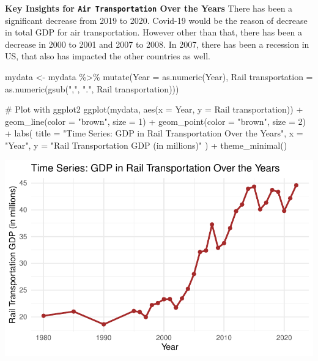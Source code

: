 \documentclass[
  letterpaper,
  DIV=11,
  numbers=noendperiod]{scrreprt}
\newenvironment{Shaded}{\begin{snugshade}}{\end{snugshade}}
\newcommand{\AttributeTok}[1]{\textcolor[rgb]{0.40,0.45,0.13}{#1}}
\newcommand{\CommentTok}[1]{\textcolor[rgb]{0.37,0.37,0.37}{#1}}
\newcommand{\DecValTok}[1]{\textcolor[rgb]{0.68,0.00,0.00}{#1}}
\newcommand{\FunctionTok}[1]{\textcolor[rgb]{0.28,0.35,0.67}{#1}}
\newcommand{\NormalTok}[1]{\textcolor[rgb]{0.00,0.23,0.31}{#1}}
\newcommand{\OtherTok}[1]{\textcolor[rgb]{0.00,0.23,0.31}{#1}}
\newcommand{\SpecialCharTok}[1]{\textcolor[rgb]{0.37,0.37,0.37}{#1}}
\newcommand{\StringTok}[1]{\textcolor[rgb]{0.13,0.47,0.30}{#1}}
\begin{document}
\textbf{Key Insights for \texttt{Air\ Transportation} Over the Years}
There has been a significant decrease from 2019 to 2020. Covid-19 would
be the reason of decrease in total GDP for air transportation. However
other than that, there has been a decrease in 2000 to 2001 and 2007 to
2008. In 2007, there has been a recession in US, that also has impacted
the other countries as well.

\begin{Shaded}
\begin{Highlighting}[]
\NormalTok{mydata }\OtherTok{\textless{}{-}}\NormalTok{ mydata }\SpecialCharTok{\%\textgreater{}\%}
  \FunctionTok{mutate}\NormalTok{(}\AttributeTok{Year =} \FunctionTok{as.numeric}\NormalTok{(Year),}
         \StringTok{\textasciigrave{}}\AttributeTok{Rail transportation}\StringTok{\textasciigrave{}} \OtherTok{=} \FunctionTok{as.numeric}\NormalTok{(}\FunctionTok{gsub}\NormalTok{(}\StringTok{","}\NormalTok{, }\StringTok{"."}\NormalTok{, }\StringTok{\textasciigrave{}}\AttributeTok{Rail transportation}\StringTok{\textasciigrave{}}\NormalTok{)))}

\CommentTok{\# Plot with ggplot2}
\FunctionTok{ggplot}\NormalTok{(mydata, }\FunctionTok{aes}\NormalTok{(}\AttributeTok{x =}\NormalTok{ Year, }\AttributeTok{y =} \StringTok{\textasciigrave{}}\AttributeTok{Rail transportation}\StringTok{\textasciigrave{}}\NormalTok{)) }\SpecialCharTok{+}
  \FunctionTok{geom\_line}\NormalTok{(}\AttributeTok{color =} \StringTok{"brown"}\NormalTok{, }\AttributeTok{size =} \DecValTok{1}\NormalTok{) }\SpecialCharTok{+}
  \FunctionTok{geom\_point}\NormalTok{(}\AttributeTok{color =} \StringTok{"brown"}\NormalTok{, }\AttributeTok{size =} \DecValTok{2}\NormalTok{) }\SpecialCharTok{+}
  \FunctionTok{labs}\NormalTok{(}
    \AttributeTok{title =} \StringTok{"Time Series: GDP in Rail Transportation Over the Years"}\NormalTok{,}
    \AttributeTok{x =} \StringTok{"Year"}\NormalTok{,}
    \AttributeTok{y =} \StringTok{"Rail Transportation GDP (in millions)"}
\NormalTok{  ) }\SpecialCharTok{+}
  \FunctionTok{theme\_minimal}\NormalTok{()}
\end{Highlighting}
\end{Shaded}

\includegraphics{FinalProject_Abigail_files/figure-pdf/unnamed-chunk-3-1.pdf}
\end{document}
